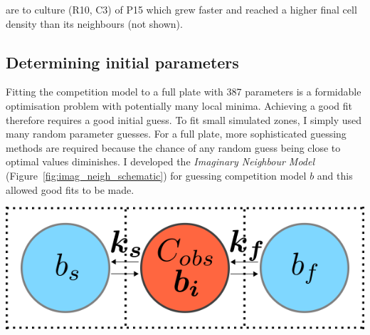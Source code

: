 \begin{Figure}
{    are to culture (R10, C3) of P15 which grew faster and reached a
    higher final cell density than its neighbours (not shown).}
  \label{fig:correction}
\end{Figure}

\subsection{Determining initial parameters}
\label{sec:initial_guess}

Fitting the competition model to a full plate with 387 parameters is a
formidable optimisation problem with potentially many local
minima. Achieving a good fit therefore requires a good initial
guess. To fit small simulated zones, I simply used many random
parameter guesses. For a full plate, more sophisticated guessing
methods are required because the chance of any random guess being
close to optimal values diminishes. I developed the \textit{Imaginary
  Neighbour Model} (Figure~\ref{fig:imag_neigh_schematic}) for
guessing competition model \(b\) and this allowed good fits to be
made.
\graphicspath{{images/imag_neigh_schematic/}}
\begin{Figure}
  \centering
  \includegraphics[width=\linewidth]{final/imag_neigh_schematic_2}
  \label{fig:imag_neigh_schematic}
\end{Figure}


